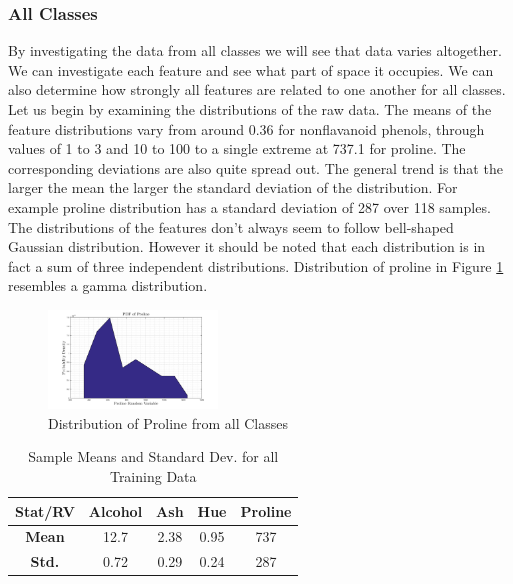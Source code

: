 \documentclass[10pt,twocolumn,letterpaper]{article}
\begin{document}
\vspace{-3mm}

\subsubsection{All Classes} \label{sec:CovAll}

\indent \indent By investigating the data from all classes we will see that data varies altogether. We can investigate each feature and see what part of space it occupies. We can also determine how strongly all features are related to one another for all classes. Let us begin by examining the distributions of the raw data. The means of the feature distributions vary from around 0.36 for nonflavanoid phenols, through values of 1 to 3 and 10 to 100 to a single extreme at 737.1 for proline. The corresponding deviations are also quite spread out. The general trend is that the larger the mean the larger the standard deviation of the distribution. For example proline distribution has a standard deviation of 287 over 118 samples. The distributions of the features don't always seem to follow bell-shaped Gaussian distribution. However it should be noted that each distribution is in fact a sum of three independent distributions. Distribution of proline in Figure \ref{fig:DistProline} resembles a gamma distribution.

\begin{figure}[H]
\centering
\includegraphics[width=0.4\textwidth]{../results/Q1_ProlineDist}
\caption{Distribution of Proline from all Classes \label{fig:DistProline}}
\end{figure}

\begin{table}[H]
\caption{Sample Means and Standard Dev. for all Training Data \label{tab:statAll}}
\small
\begin{center}
\begin{tabular}{|c| c c c c|}
\hline
\bf Stat/RV & Alcohol & Ash & Hue & Proline \\ [0.5ex]
\hline
\bf Mean & 12.7 & 2.38 & 0.95 & 737 \\ [0.5ex]
\hline
\bf Std. & 0.72 & 0.29 & 0.24 & 287 \\ [0.5ex]
\hline
\end{tabular}
\end{center}
\end{table}
\end{document}
